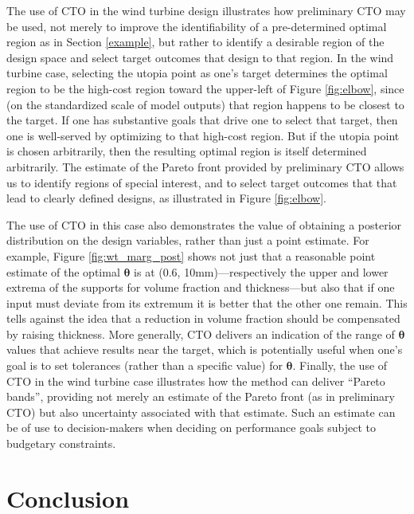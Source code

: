 \documentclass[twocolumn,10pt]{asme2ej}
\begin{document}
%
The use of CTO in the wind turbine design illustrates how preliminary CTO may be used, not merely to improve the identifiability of a pre-determined optimal region as in Section \ref{example}, but rather to identify a desirable region of the design space and select target outcomes that design to that region.
%
In the wind turbine case, selecting the utopia point as one's target determines the optimal region to be the high-cost region toward the upper-left of Figure \ref{fig:elbow}, since (on the standardized scale of model outputs) that region happens to be closest to the target.
%
If one has substantive goals that drive one to select that target, then one is well-served by optimizing to that high-cost region.
%
But if the utopia point is chosen arbitrarily, then the resulting optimal region is itself determined arbitrarily.
%
The estimate of the Pareto front provided by preliminary CTO allows us to identify regions of special interest, and to select target outcomes that that lead to clearly defined designs, as illustrated in Figure \ref{fig:elbow}.
%

%
The use of CTO in this case also demonstrates the value of obtaining a posterior distribution on the design variables, rather than just a point estimate.
%
For example, Figure \ref{fig:wt_marg_post} shows not just that a reasonable point estimate of the optimal $\boldsymbol\theta$ is at (0.6, 10mm)---respectively the upper and lower extrema of the supports for volume fraction and thickness---but also that if one input must deviate from its extremum it is better that the other one remain.
%
This tells against the idea that a reduction in volume fraction should be compensated by raising thickness.
%
More generally, CTO delivers an indication of the range of $\boldsymbol\theta$ values that achieve results near the target, which is potentially useful when one's goal is to set tolerances (rather than a specific value) for $\boldsymbol\theta$.
%
Finally, the use of CTO in the wind turbine case illustrates how the method can deliver ``Pareto bands'', providing not merely an estimate of the Pareto front (as in preliminary CTO) but also uncertainty associated with that estimate.
%
Such an estimate can be of use to decision-makers when deciding on performance goals subject to budgetary constraints.



\section{Conclusion} \label{conclusion}
\end{document}
